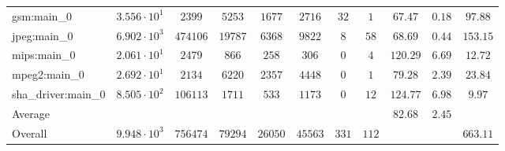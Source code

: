 \begin{tabular}{|l|c|c|c|c|c|c|c|c|c|c|}
gsm:main\_0             & $ 3.556 \cdot 10^{1} $ & $ 2399   $ & $ 5253  $ & $ 1677  $ & $ 2716  $ & $ 32  $ & $ 1   $ & $ 67.47       $ & $ 0.18    $ & $ 97.88   $ \\
jpeg:main\_0            & $ 6.902 \cdot 10^{3} $ & $ 474106 $ & $ 19787 $ & $ 6368  $ & $ 9822  $ & $ 8   $ & $ 58  $ & $ 68.69       $ & $ 0.44    $ & $ 153.15  $ \\
mips:main\_0            & $ 2.061 \cdot 10^{1} $ & $ 2479   $ & $ 866   $ & $ 258   $ & $ 306   $ & $ 0   $ & $ 4   $ & $ 120.29      $ & $ 6.69    $ & $ 12.72   $ \\
mpeg2:main\_0           & $ 2.692 \cdot 10^{1} $ & $ 2134   $ & $ 6220  $ & $ 2357  $ & $ 4448  $ & $ 0   $ & $ 1   $ & $ 79.28       $ & $ 2.39    $ & $ 23.84   $ \\
sha\_driver:main\_0     & $ 8.505 \cdot 10^{2} $ & $ 106113 $ & $ 1711  $ & $ 533   $ & $ 1173  $ & $ 0   $ & $ 12  $ & $ 124.77      $ & $ 6.98    $ & $ 9.97    $ \\
\hline
Average                 & $                    $ & $        $ & $       $ & $       $ & $       $ & $     $ & $     $ & $ 82.68       $ & $ 2.45    $ & $         $ \\
\hline
Overall                 & $ 9.948 \cdot 10^{3} $ & $ 756474 $ & $ 79294 $ & $ 26050 $ & $ 45563 $ & $ 331 $ & $ 112 $ & $             $ & $         $ & $ 663.11  $ \\
\hline
\end{tabular}
